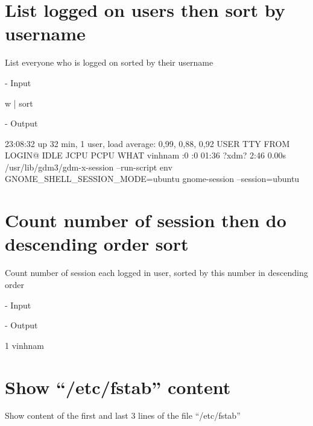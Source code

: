 \documentclass[10pt, a4paper]{article}
\begin{document}
\fbox{
\theverbbox
}

\section{List logged on users then sort by username}

List everyone who is logged on sorted by their username

\noindent - Input

\begin{verbbox}
w | sort
\end{verbbox}

\fbox{
\theverbbox
}

\noindent - Output

\begin{verbbox}
 23:08:32 up 32 min,  1 user,  load average: 0,99, 0,88, 0,92
USER     TTY      FROM             LOGIN@   IDLE   JCPU   PCPU WHAT
vinhnam  :0       :0               01:36   ?xdm?   2:46   0.00s /usr/lib/gdm3/gdm-x-session
--run-script env GNOME_SHELL_SESSION_MODE=ubuntu gnome-session --session=ubuntu
\end{verbbox}

\fbox{
\theverbbox
}

\section{Count number of session then do descending order sort}

Count number of session each logged in user, sorted by this number in descending order

\noindent - Input


\fbox{
\theverbbox
}

\noindent - Output

\begin{verbbox}
      1 vinhnam 
\end{verbbox}

\fbox{
\theverbbox
}

\section{Show “/etc/fstab” content}

Show content of the first and last 3 lines of the file “/etc/fstab”
\end{document}
